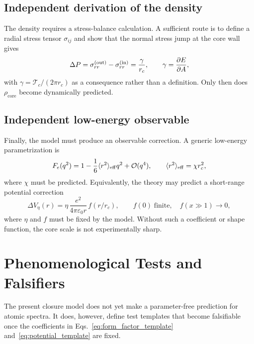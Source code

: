 \documentclass[aps,pra,preprint,longbibliography,nofootinbib]{revtex4-2}
\begin{document}
\subsection{Independent derivation of the density}

The density requires a stress-balance calculation.  A sufficient route is
to define a radial stress tensor $\sigma_{ij}$ and show that the normal
stress jump at the core wall gives
\begin{equation}
  \Delta P = \sigma_{rr}^{\rm(out)}-\sigma_{rr}^{\rm(in)}
           = \frac{\gamma}{r_c},
  \qquad
  \gamma = \frac{\partial E}{\partial A},
  \label{eq:needed_laplace}
\end{equation}
with $\gamma=\mathcal{T}_c/(2\pi r_c)$ as a consequence rather than a
definition.  Only then does $\rho_{\mathrm{core}}$ become dynamically
predicted.

\subsection{Independent low-energy observable}

Finally, the model must produce an observable correction.  A generic
low-energy parametrization is
\begin{equation}
  F_e(q^2)=1-\frac{1}{6}\langle r^2\rangle_{\rm eff}q^2+\mathcal{O}(q^4),
  \qquad
  \langle r^2\rangle_{\rm eff}=\chi r_c^2,
  \label{eq:form_factor_template}
\end{equation}
where $\chi$ must be predicted.  Equivalently, the theory may predict a
short-range potential correction
\begin{equation}
  \Delta V_\eta(r)=
  \eta\,\frac{e^2}{4\pi\varepsilon_0 r}\,f(r/r_c),
  \qquad f(0)\;\mathrm{finite},\quad f(x\gg1)\to0,
  \label{eq:potential_template}
\end{equation}
where $\eta$ and $f$ must be fixed by the model.  Without such a
coefficient or shape function, the core scale is not experimentally
sharp.

\section{Phenomenological Tests and Falsifiers}
\label{sec:falsifiers}

The present closure model does not yet make a parameter-free prediction
for atomic spectra.  It does, however, define test templates that become
falsifiable once the coefficients in Eqs.~\eqref{eq:form_factor_template}
and~\eqref{eq:potential_template} are fixed.
\end{document}
